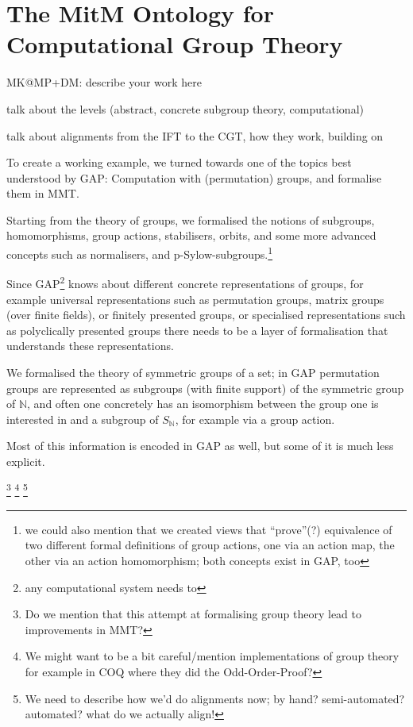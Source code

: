 \section{The MitM Ontology for Computational Group Theory}\label{sec:cgt}
\begin{todolist}{MK@MP+DM: describe your work here}
\item talk about the levels (abstract, concrete subgroup theory, computational)
\item talk about alignments from the IFT to the CGT, how they work, building
  on~\cite{MueRoYuRa:abtafs17,MueGauKal:cacfms17} 
\end{todolist}

To create a working example, we turned towards one of the topics best
understood by GAP: Computation with (permutation) groups, and formalise them in
MMT.

Starting from the theory of groups, we formalised the notions of
subgroups, homomorphisms, group actions, stabilisers, orbits, and some more
advanced concepts such as normalisers, and p-Sylow-subgroups.\footnote{we could
  also mention that we created views that ``prove''(?) equivalence of two
  different formal definitions of group actions, one via an action map, the
  other via an action homomorphism; both concepts exist in GAP, too }

Since GAP\footnote{any computational system needs to} knows about different
concrete representations of groups, for example universal representations such
as permutation groups, matrix groups (over finite fields), or finitely presented
groups, or specialised representations such as polyclically presented groups
there needs to be a layer of formalisation that
understands these representations.

We formalised the theory of symmetric groups of a set; in GAP permutation groups
are represented as subgroups (with finite support) of the symmetric group of
$\mathbb{N}$, and often one concretely has an isomorphism between the group one
is interested in and a subgroup of $S_{\mathbb{N}}$, for example
via a group action.

Most of this information is encoded in GAP as well, but some of it is much less
explicit.

\footnote{Do we mention that this attempt at formalising group theory lead to
  improvements in MMT?}
\footnote{We might want to be a bit careful/mention implementations of group
  theory for example in COQ where they did the Odd-Order-Proof?}
\footnote{We need to describe how we'd do alignments now; by hand?
  semi-automated? automated? what do we actually align!}
